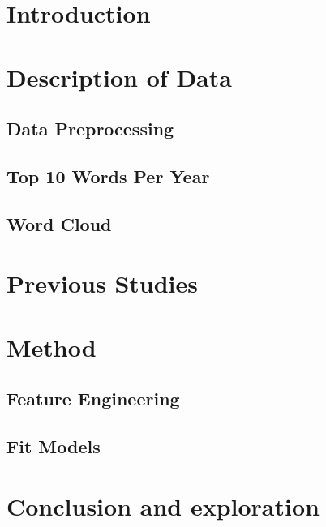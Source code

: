 \documentclass[12pt]{article}
\begin{document}
\section{Introduction} \label{sec:Intro}



\section{Description of Data} \label{sec:Descript}

\subsection{Data Preprocessing}



\subsection{Top 10 Words Per Year}



\subsection{Word Cloud}



\section{Previous Studies}

\section{Method}

\subsection{Feature Engineering}

\subsection{Fit Models}


\section{Conclusion and exploration}
\end{document}
